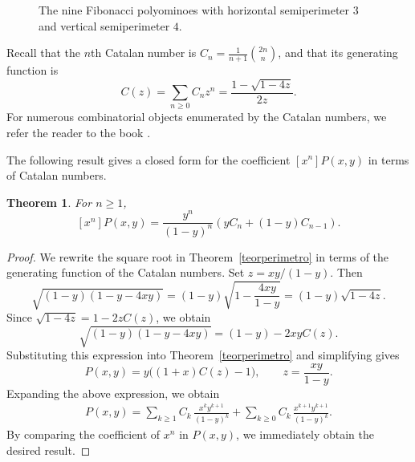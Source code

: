 \documentclass[12pt]{amsart}
\theoremstyle{plain}
\newtheorem{theorem}{Theorem}[section]
\theoremstyle{definition}
\def\x{\hspace{3ex}}    %
\def\y{\hspace{2.45ex}}  %
\begin{document}
\begin{figure}[ht!]
\hspace{0.5cm}
\hspace{0.5cm}
\hspace{0.5cm}
\caption{The nine Fibonacci polyominoes with horizontal semiperimeter $3$ and vertical semiperimeter $4$.}\label{fig2}
\end{figure}

Recall that the $n$th Catalan number is $C_n=\frac{1}{n+1}\binom{2n}{n}$, and that its generating function is  
$$C(z)=\sum_{n\geq 0}C_n z^n=\frac{1-\sqrt{1-4z}}{2z}.$$
 For numerous combinatorial objects enumerated by the Catalan numbers, we refer the reader to the book \cite{stan}. 

The following result gives a closed form for the coefficient $[x^n]P(x,y)$ in terms of Catalan numbers. 

\begin{theorem}
 For $n\geq 1$, 
 \[[x^n]P(x,y)=\frac{y^n}{(1-y)^n}\left(yC_n + (1-y)C_{n-1}\right).\]
\end{theorem}
\begin{proof}
We rewrite the square root in Theorem~\ref{teorperimetro} in terms of the generating function of the Catalan numbers. Set $z=xy/(1-y)$. Then
\[
\sqrt{(1-y)(1-y-4xy)}
= (1-y)\sqrt{1-\frac{4xy}{1-y}}
= (1-y)\sqrt{1-4z}.
\]
Since $\sqrt{1-4z}=1-2zC(z)$, we obtain
\[
\sqrt{(1-y)(1-y-4xy)}=(1-y)-2xy C(z).
\]
Substituting this expression into Theorem~\ref{teorperimetro} and simplifying gives
\[
P(x,y)=y\bigl((1+x)C(z)-1\bigr),
 \qquad z=\frac{xy}{1-y}.
\]
Expanding the above expression, we obtain 
\begin{align}\label{ExPCat}
P(x,y)
= \sum_{k\geq 1} C_k\, \frac{x^k y^{k+1}}{(1-y)^k}
+
\sum_{k\geq 0} C_k\, \frac{x^{k+1} y^{k+1}}{(1-y)^k}.
\end{align}
By comparing the coefficient of $x^n$ in $P(x,y)$, we immediately obtain the desired result.
\end{proof}
\end{document}
